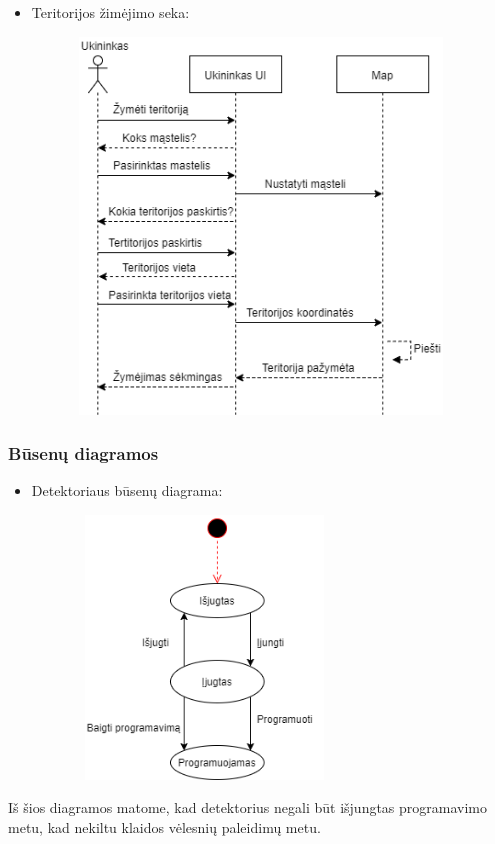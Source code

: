 \documentclass[oneside]{VUMIFPSkursinis}
\begin{document}
\begin{itemize}
\item Teritorijos žimėjimo seka:
	\begin{figure}[H]
		\centering	
	\includegraphics[width=10cm,height=10cm,keepaspectratio]{ŽymėtiTeritorijas.png}
	\caption{}
	\label{fig:ŽymėtiTeritorijas}
\end{figure}

\end{itemize}
\subsubsection{Būsenų diagramos}
\begin{itemize}
\item Detektoriaus būsenų diagrama:

		\begin{figure}[H]
		\centering	
	\includegraphics[width=7cm,height=7cm,keepaspectratio]{BusenuDetektorius.png}
	\caption{}
	\label{fig:BusenuDetektorius}
\end{figure}

\end{itemize}
Iš šios diagramos  matome, kad detektorius negali būt išjungtas programavimo metu, kad nekiltu klaidos vėlesnių paleidimų metu.
\end{document}
